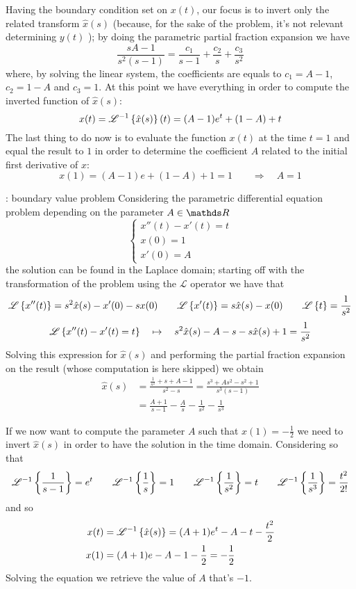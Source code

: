 	Having the boundary condition set on $x(t)$, our focus is to invert only the related transform $\hat x(s)$ (because, for the sake of the problem, it's not relevant determining $y(t)$ ); by doing the parametric partial fraction expansion we have
	\[ \frac{sA - 1}{s^2(s-1)} = \frac{c_1}{s-1} + \frac{c_2}{s} + \frac{c_3}{s^2}  \]
	where, by solving the linear system, the coefficients are equals to $c_1 = A-1$, $c_2 = 1-A$ and $c_3 = 1$. At this point we have everything in order to compute the inverted function of $\hat x(s)$:
	\[ x(t) = \mathscr{L}^{-1} \left\{ \hat x(s) \right\}(t) = (A-1)e^t + (1-A) + t \]
	The last thing to do now is to evaluate the function $x(t)$ at the time $t=1$ and equal the result to $1$ in order to determine the coefficient $A$ related to the initial first derivative of $x$:
	\[ x(1) = (A-1) e + (1-A) + 1 = 1 \qquad \Rightarrow \quad A = 1 \]
	
	\begin{example}{: boundary value problem}
		Considering the parametric differential equation problem depending on the parameter $A\in \R$
		\[ \begin{cases}
			x''(t) - x'(t) = t \\
			x(0) = 1 \\ x'(0) = A
		\end{cases} \]
		the solution can be found in the Laplace domain; starting off with the transformation of the problem using the $\mathscr L$ operator we have that
		\[ \mathscr{L} \left\{ x''(t) \right\} = s^2 \hat x(s) - x'(0) - s x(0) \qquad \mathscr{L} \left\{ x'(t) \right\} = s \hat x(s) - x(0) \qquad \mathscr{L} \left\{ t \right\} = \frac 1 {s^2} \]
		\[ \mathscr{L} \left\{ x''(t) - x'(t) = t \right\} \quad \mapsto \quad s^2 \hat x(s) - A - s -s\hat x(s) +1 = \frac 1 {s^2} \]
		Solving this expression for $\hat x(s)$ and performing the partial fraction expansion on the result (whose computation is here skipped) we obtain
		\begin{align*}
			\hat x(s) & = \frac{\frac 1 {s^2} + s + A - 1}{s^2-s} = \frac{s^3 + As^2 - s^2 + 1}{s^3(s-1)} \\
			& = \frac{A+1}{s-1} - \frac A s - \frac 1 {s^2} - \frac 1 {s^3}
		\end{align*}
		
		If we now want to compute the parameter $A$ such that $x(1) = - \frac 1 2$ we need to invert $\hat x(s)$ in order to have the solution in the time domain. Considering so that
		\[ \mathscr{L}^{-1} \left\{ \frac 1{s-1} \right\} = e^t \qquad \mathscr{L}^{-1} \left\{ \frac 1 s \right\} = 1 \qquad \mathscr{L}^{-1} \left\{ \frac 1 {s^2} \right\} = t \qquad \mathscr{L}^{-1} \left\{  \frac 1 {s^3} \right\} = \frac {t^2}{2!} \]
		and so
		\begin{align*}
			 x(t) & = \mathscr{L}^{-1} \left\{ \hat x(s) \right\} = (A+1)e^t - A - t -\frac {t^2}2  \\
			 x(1) & = (A+1) e - A - 1 - \frac 1 2 = -\frac 1 2
		\end{align*}
		Solving the equation we retrieve the value of $A$ that's $-1$.
		
	\end{example}
	
	
	
	
	
	
	
	
	
	
	
	
	
	
	
	
	
	
	
	
	
	
	
	
	
	
	
	
	
